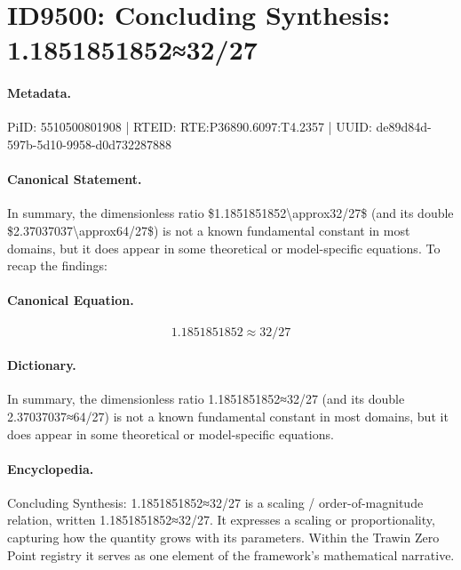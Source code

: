 \section*{ID9500: Concluding Synthesis: 1.1851851852≈32/27}
\paragraph{Metadata.}
PiID: 5510500801908 | RTEID: RTE:P36890.6097:T4.2357 | UUID: de89d84d-597b-5d10-9958-d0d732287888

\paragraph{Canonical Statement.}
In summary, the dimensionless ratio \$1.1851851852\textbackslash{}approx32/27\$ (and its double \$2.37037037\textbackslash{}approx64/27\$) is not a known fundamental constant in most domains, but it does appear in some theoretical or model-specific equations. To recap the findings:

\paragraph{Canonical Equation.}
\[
1.1851851852\approx32/27
\]

\paragraph{Dictionary.}
In summary, the dimensionless ratio 1.1851851852≈32/27 (and its double 2.37037037≈64/27) is not a known fundamental constant in most domains, but it does appear in some theoretical or model-specific equations.

\paragraph{Encyclopedia.}
Concluding Synthesis: 1.1851851852≈32/27 is a scaling / order-of-magnitude relation, written 1.1851851852≈32/27. It expresses a scaling or proportionality, capturing how the quantity grows with its parameters. Within the Trawin Zero Point registry it serves as one element of the framework's mathematical narrative.
